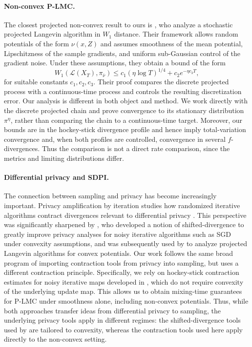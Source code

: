 \documentclass[10pt, journal]{IEEEtran}
\begin{document}
\paragraph{Non-convex P-LMC.} The closest projected non-convex result to ours is \cite{lamperski2021projected}, who analyze a stochastic projected Langevin algorithm in $W_1$ distance. Their framework allows random potentials of the form $\nu(x,Z)$ and assumes smoothness of the mean potential, Lipschitzness of the sample gradients, and uniform sub-Gaussian control of the gradient noise. Under these assumptions, they obtain a bound of the form $$W_1(\mathcal L(X_T),\pi_{\bar\nu})\le c_1(\eta\log T)^{1/4}+c_2e^{-\eta c_3T},$$ for suitable constants $c_1,c_2,c_3$. Their proof compares the discrete projected process with a continuous-time process and controls the resulting discretization error. Our analysis is different in both object and method. We work directly with the discrete projected chain and prove convergence to its stationary distribution $\pi^\eta$, rather than comparing the chain to a continuous-time target. Moreover, our bounds are in the hockey-stick divergence profile and hence imply total-variation convergence and, when both profiles are controlled, convergence in several $f$-divergences. Thus the comparison is not a direct rate comparison, since the metrics and limiting distributions differ. 




\paragraph{Differential privacy and SDPI.} The connection between sampling and privacy has become increasingly important. Privacy amplification by iteration studies how randomized iterative algorithms contract divergences relevant to differential privacy \cite{feldman2018privacy,asoodeh2020contraction,asoodeh2023privacy,PrivacyAmplificationMixing}. This perspective was significantly sharpened by \cite{altschuler2022privacy}, who developed a notion of shifted-divergence to greatly improve privacy analyses for noisy iterative algorithms such as SGD under convexity assumptions, and was subsequently used by \cite{altschuler2022resolving} to analyze projected Langevin algorithms for convex potentials. Our work follows the same broad program of importing contraction tools from privacy into sampling, but uses a different contraction principle. Specifically, we rely on hockey-stick contraction estimates for noisy iterative maps developed in \cite{asoodeh2020contraction,asoodeh2023privacy}, which do not require convexity of the underlying update map. This allows us to obtain mixing-time guarantees for P-LMC under smoothness alone, including non-convex potentials. Thus, while both approaches transfer ideas from differential privacy to sampling, the underlying privacy tools apply in different regimes: the shifted-divergence tools used by \cite{altschuler2022resolving} are tailored to convexity, whereas the contraction tools used here apply directly to the non-convex setting.
\end{document}

